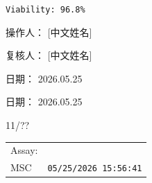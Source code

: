 \documentclass[UTF8,10pt,a4paper,fontset=fandol]{ctexart}
\newcommand{\fieldvalue}[1]{#1}
\newcommand{\handwritten}[1]{#1}
\begin{document}
\medskip

\noindent
\texttt{Viability: 96.8\%}

\medskip

\begin{center}
\hspace{0.04\textwidth}

\vspace{1.0cm}

\hspace{0.04\textwidth}
\end{center}

\vfill

\noindent
操作人：
\fieldvalue{\handwritten{[中文姓名]}}

\medskip

\noindent
复核人：
\fieldvalue{\handwritten{[中文姓名]}}

\hfill
日期：
\fieldvalue{\handwritten{2026.05.25}}

\medskip

\noindent
日期：
\fieldvalue{\handwritten{2026.05.25}}

\bigskip

\handwritten{11/??}

\newpage

\noindent
\begin{tabularx}{\textwidth}{@{}Xr@{}}
Assay: \\
\fieldvalue{MSC}
&
\fieldvalue{\texttt{05/25/2026 15:56:41}}
\end{tabularx}
\end{document}

